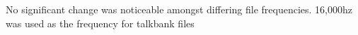No significant change was noticeable amongst differing file frequencies. 16,000hz was used as the frequency for talkbank files


%
%

